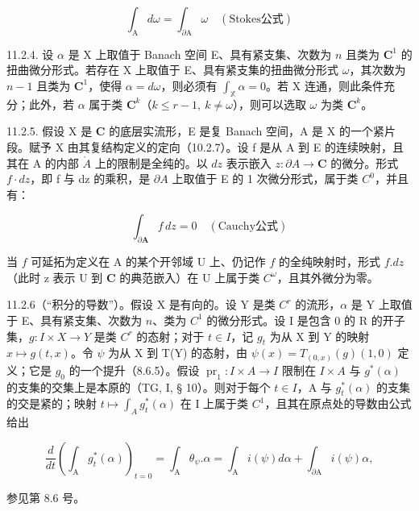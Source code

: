 \[
\int_ {\mathrm{A}} d \omega = \int_ {\partial \mathrm{A}} \omega \quad (\text{Stokes公式})
\]

11.2.4. 设 \(\alpha\) 是 X 上取值于 Banach 空间 E、具有紧支集、次数为 \(n\) 且类为 \(\mathbf{C}^1\) 的扭曲微分形式。若存在 X 上取值于 E、具有紧支集的扭曲微分形式 \(\omega\)，其次数为 \(n - 1\) 且类为 \(\mathbf{C}^1\)，使得 \(\alpha = d\omega\)，则必须有 \(\int_{\mathbb{X}} \alpha = 0\)。若 X 连通，则此条件充分；此外，若 \(\alpha\) 属于类 \(\mathbf{C}^k\)（\(k\leqslant r-1,\ k\neq\omega\)），则可以选取 \(\omega\) 为类 \(\mathbf{C}^k\)。

11.2.5. 假设 X 是 \(\mathbf{C}\) 的底层实流形，E 是复 Banach 空间，A 是 X 的一个紧片段。赋予 X 由其复结构定义的定向（10.2.7）。设 f 是从 A 到 E 的连续映射，且其在 A 的内部 \(\mathring{A}\) 上的限制是全纯的。以 \(dz\) 表示嵌入 \(z\colon\partial A\to\mathbf{C}\) 的微分。形式 \(f\cdot dz\)，即 f 与 dz 的乘积，是 \(\partial A\) 上取值于 E 的 1 次微分形式，属于类 \(C^{0}\)，并且有：

\[
\int_ {\partial \mathbf {A}} f\, d z = 0 \quad (\text{Cauchy公式})
\]

当 \(f\) 可延拓为定义在 A 的某个开邻域 U 上、仍记作 \(f\) 的全纯映射时，形式 \(f.dz\)（此时 z 表示 U 到 \(\mathbf{C}\) 的典范嵌入）在 U 上属于类 \(C^{\omega}\)，且其外微分为零。

11.2.6（“积分的导数”）。假设 X 是有向的。设 Y 是类 \(C^{r}\) 的流形，\(\alpha\) 是 Y 上取值于 E、具有紧支集、次数为 \(n\)、类为 \(C^{1}\) 的微分形式。设 I 是包含 0 的 R 的开子集，\(g: I \times X \to Y\) 是类 \(C^{r}\) 的态射；对于 \(t \in I\)，记 \(g_{t}\) 为从 X 到 Y 的映射 \(x \mapsto g(t, x)\)。令 \(\psi\) 为从 X 到 T(Y) 的态射，由 \(\psi(x) = T_{(0,x)}(g)(1,0)\) 定义；它是 \(g_{0}\) 的一个提升（8.6.5）。假设 \(\operatorname{pr}_{1}\colon I\times A\to I\) 限制在 \(I\times A\) 与 \(g^{*}(\alpha)\) 的支集的交集上是本原的（TG, I, § 10）。则对于每个 \(t \in I\)，A 与 \(g_{t}^{*}(\alpha)\) 的支集的交是紧的；映射 \(t \mapsto \int_{A} g_{t}^{*}(\alpha)\) 在 I 上属于类 \(C^{1}\)，且其在原点处的导数由公式给出

\[
\frac {d}{d t} \left(\int_ {\mathrm{A}} g _ {t} ^ {*} (\alpha)\right) _ {t = 0} = \int_ {\mathrm{A}} \theta_ {\psi}. \alpha = \int_ {\mathrm{A}} i (\psi) d \alpha + \int_ {\partial \mathrm{A}} i (\psi) \alpha ,
\]

参见第 8.6 号。


